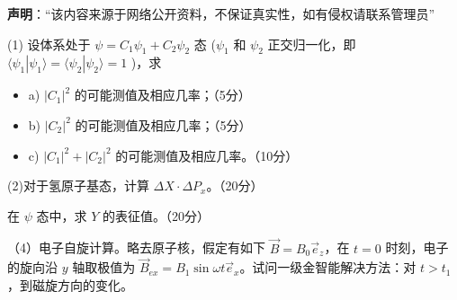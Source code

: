 
\textbf{声明}：“该内容来源于网络公开资料，不保证真实性，如有侵权请联系管理员”

    (1) 设体系处于 $\psi = C_1 \psi_1 + C_2 \psi_2$ 态 ($\psi_1$ 和 $\psi_2$ 正交归一化，即 $\langle \psi_1 | \psi_1 \rangle = \langle \psi_2 | \psi_2 \rangle = 1$ )，求
     
    \begin{itemize}
        \item a) $|C_1|^2$ 的可能测值及相应几率；（5分）
        \item b) $|C_2|^2$ 的可能测值及相应几率；（5分）
        \item c) $|C_1|^2 + |C_2|^2$ 的可能测值及相应几率。（10分）
   \end{itemize}
 
    (2)对于氢原子基态，计算 $\Delta X \cdot \Delta P_x$。（20分）

   在 $\psi$ 态中，求 $Y$ 的表征值。（20分）
 
   （4）电子自旋计算。略去原子核，假定有如下 $\vec{B} = B_0 \vec{e}_z$，在 $t=0$ 时刻，电子的旋向沿 $y$ 轴取极值为 $\vec{B}_{ex} = B_1 \sin \omega t \vec{e}_x$。试问一级金智能解决方法：对 $t>t_1$，到磁旋方向的变化。
